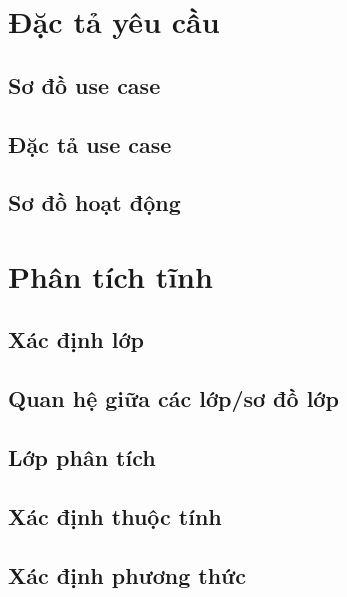 \documentclass{article}
\begin{document}
\section{Đặc tả yêu cầu}

  \subsection{Sơ đồ use case}

  \subsection{Đặc tả use case}

  \subsection{Sơ đồ hoạt động}

\section{Phân tích tĩnh}

  \subsection{Xác định lớp}

  \subsection{Quan hệ giữa các lớp/sơ đồ lớp}

  \subsection{Lớp phân tích}

  \subsection{Xác định thuộc tính}

  \subsection{Xác định phương thức}

\section{}
\end{document}
